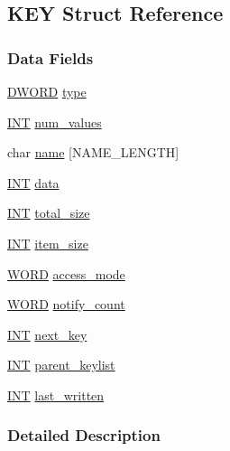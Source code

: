 \subsection{KEY Struct Reference}
\label{structKEY}
\subsubsection*{Data Fields}
\begin{DoxyCompactItemize}
\item 
\hyperlink{vt2_8h_a798af1e30bc65f319c1a246cecf59e39}{DWORD} \hyperlink{structKEY_a3360f9082d5083ea144f093d0cd774e3}{type}
\item 
\hyperlink{vppg_8h_a392e62da233ed3e2f7c3fd4f487a3896}{INT} \hyperlink{structKEY_a2604fa0fc38ce19b011785f806185a02}{num\_\-values}
\item 
char \hyperlink{structKEY_aab4927ab8eb9921525d82761adb11f5c}{name} \mbox{[}NAME\_\-LENGTH\mbox{]}
\item 
\hyperlink{vppg_8h_a392e62da233ed3e2f7c3fd4f487a3896}{INT} \hyperlink{structKEY_affecbc127d0afea9ac19ed64600760a4}{data}
\item 
\hyperlink{vppg_8h_a392e62da233ed3e2f7c3fd4f487a3896}{INT} \hyperlink{structKEY_a553ba6fe87ca0b1dd08bcdc8fa15e6fa}{total\_\-size}
\item 
\hyperlink{vppg_8h_a392e62da233ed3e2f7c3fd4f487a3896}{INT} \hyperlink{structKEY_acd1951fdb8bf0dec79ef833f6dec9276}{item\_\-size}
\item 
\hyperlink{vt2_8h_a2b0e863dadf920709ec53d9088ee7c91}{WORD} \hyperlink{structKEY_a68512ae899ef674617e67dbe51a71c7a}{access\_\-mode}
\item 
\hyperlink{vt2_8h_a2b0e863dadf920709ec53d9088ee7c91}{WORD} \hyperlink{structKEY_a4c4c4ab142ebbe60bdb1c149a8ac2047}{notify\_\-count}
\item 
\hyperlink{vppg_8h_a392e62da233ed3e2f7c3fd4f487a3896}{INT} \hyperlink{structKEY_ab8303fc464bc3f0c1d75544cef0a725d}{next\_\-key}
\item 
\hyperlink{vppg_8h_a392e62da233ed3e2f7c3fd4f487a3896}{INT} \hyperlink{structKEY_a7537bff06e9a41b4b211ccf665911c8e}{parent\_\-keylist}
\item 
\hyperlink{vppg_8h_a392e62da233ed3e2f7c3fd4f487a3896}{INT} \hyperlink{structKEY_a6b30a678557dddfc00f2da8b6a416225}{last\_\-written}
\end{DoxyCompactItemize}


\subsubsection{Detailed Description}


